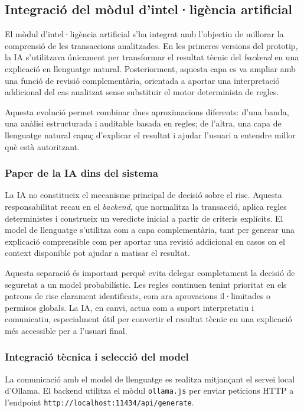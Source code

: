 \subsection{Integració del mòdul d’intel·ligència artificial}

El mòdul d’intel·ligència artificial s’ha integrat amb l’objectiu de millorar la comprensió de les transaccions analitzades. En les primeres versions del prototip, la IA s’utilitzava únicament per transformar el resultat tècnic del \textit{backend} en una explicació en llenguatge natural. Posteriorment, aquesta capa es va ampliar amb una funció de revisió complementària, orientada a aportar una interpretació addicional del cas analitzat sense substituir el motor determinista de regles.

Aquesta evolució permet combinar dues aproximacions diferents: d’una banda, una anàlisi estructurada i auditable basada en regles; de l’altra, una capa de llenguatge natural capaç d’explicar el resultat i ajudar l’usuari a entendre millor què està autoritzant.


\subsubsection{Paper de la IA dins del sistema}

La IA no constitueix el mecanisme principal de decisió sobre el risc. Aquesta responsabilitat recau en el \textit{backend}, que normalitza la transacció, aplica regles deterministes i construeix un veredicte inicial a partir de criteris explícits. El model de llenguatge s’utilitza com a capa complementària, tant per generar una explicació comprensible com per aportar una revisió addicional en casos on el context disponible pot ajudar a matisar el resultat.

Aquesta separació és important perquè evita delegar completament la decisió de seguretat a un model probabilístic. Les regles continuen tenint prioritat en els patrons de risc clarament identificats, com ara aprovacions il·limitades o permisos globals. La IA, en canvi, actua com a suport interpretatiu i comunicatiu, especialment útil per convertir el resultat tècnic en una explicació més accessible per a l’usuari final.

\subsubsection{Integració tècnica i selecció del model}

La comunicació amb el model de llenguatge es realitza mitjançant el servei local d’Ollama. El backend utilitza el mòdul \texttt{ollama.js} per enviar peticions HTTP a l’endpoint \texttt{http://localhost:11434/api/generate}.

